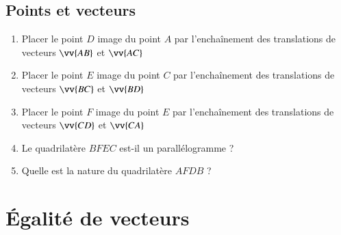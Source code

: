 \documentclass[oneside,12pt]{article}          %
\begin{document}
\subsection{Points et vecteurs} 
\begin{minipage}{0.45\linewidth} \restoreskip
	\begin{enumerate}
		\item Placer le point $D$ image du point $A$ par l'enchaînement des translations de vecteurs $\vv{AB}$ et $\vv{AC}$
		\item Placer le point $E$ image du point $C$ par l'enchaînement des translations de vecteurs $\vv{BC}$ et $\vv{BD}$
		\item Placer le point $F$ image du point $E$ par l'enchaînement des translations de vecteurs $\vv{CD}$ et $\vv{CA}$
		\item Le quadrilatère $BFEC$ est-il un parallélogramme ?
		\item Quelle est la nature du quadrilatère $AFDB$ ?
	\end{enumerate}
\end{minipage} \hspace{5mm}
\begin{minipage}{0.55\linewidth} 
\end{minipage}



\section{Égalité de vecteurs}
\end{document}
